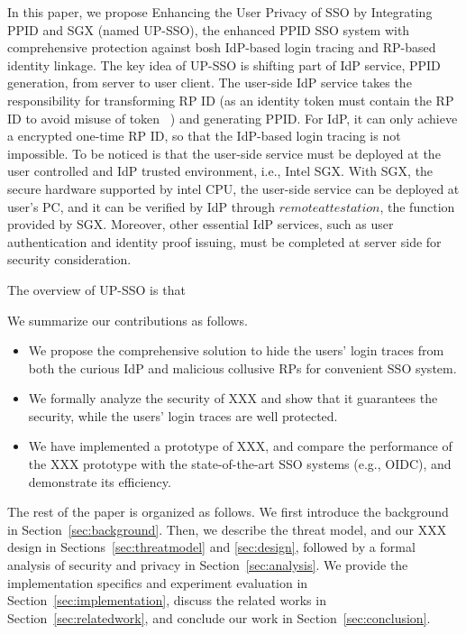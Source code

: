 In this paper, we propose Enhancing the User Privacy of SSO by Integrating PPID and SGX (named UP-SSO), the enhanced PPID SSO system with comprehensive protection against bosh IdP-based login tracing and RP-based identity linkage.
The key idea of UP-SSO is shifting part of IdP service, PPID generation, from server to user client. 
The user-side IdP service takes the responsibility for transforming RP ID (as an identity token must contain the RP ID to avoid misuse of token~\cite{YangLCZ18, WangZLG16, MainkaMS16, MainkaMSW17, YangLCZ18} ) and generating PPID. 
For IdP, it can only achieve a encrypted one-time RP ID, so that the IdP-based login tracing is not impossible.
To be noticed is that the user-side service must be deployed at the user controlled and IdP trusted environment, i.e., Intel SGX. With SGX, the secure hardware supported by intel CPU, the user-side service can be deployed at user's PC, and it can be verified by IdP through $remote attestation$, the function provided by SGX.
Moreover, other essential IdP services, such as user authentication and identity proof issuing,  must be completed at server side for security consideration. 

The overview of UP-SSO is that 


We summarize our contributions as follows.
\begin{itemize}
\item We propose the comprehensive solution to hide the users' login traces from both the curious IdP and malicious collusive RPs for convenient SSO system.
\item We formally analyze the security of XXX and show that it guarantees the security, while the users' login traces are well protected.
\item We have implemented a prototype of XXX, and compare the performance of the XXX prototype with the state-of-the-art SSO systems (e.g., OIDC), and demonstrate its efficiency.
\end{itemize}

The rest of the paper is organized as follows. We first introduce the background in Section~\ref{sec:background}. Then, we describe the threat model, and our XXX design in Sections~\ref{sec:threatmodel} and \ref{sec:design}, followed by a formal analysis of security and privacy in Section~\ref{sec:analysis}. We provide the implementation specifics and experiment evaluation in Section~\ref{sec:implementation}, discuss the related works in Section~\ref{sec:relatedwork}, and conclude our work in Section~\ref{sec:conclusion}.

